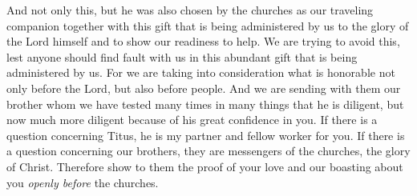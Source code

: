 \begin{biblechapter}
\verse And not only this, but he was also chosen by the churches as our traveling companion together with this gift that is being administered by us to the glory of the Lord himself and to show our readiness to help.
\verse We are trying to avoid this, lest anyone should find fault with us in this abundant gift that is being administered by us.
\verse For we are taking into consideration what is honorable not only before the Lord, but also before people.
\verse And we are sending with them our brother whom we have tested many times in many things that he is diligent, but now much more diligent because of his great confidence in you.
\verse If there is a question concerning Titus, he is my partner and fellow worker for you. If there is a question concerning our brothers, they are messengers of the churches, the glory of Christ.
\verse Therefore show to them the proof of your love and our boasting about you \textit{openly before} the churches.
\end{biblechapter}

